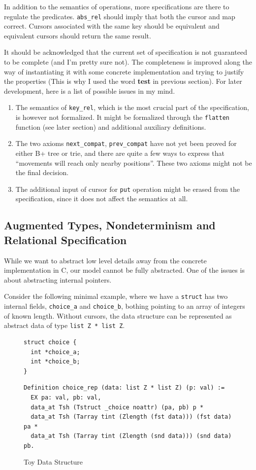 \documentclass[runningheads]{llncs}
\begin{document}
In addition to the semantics of operations, more specifications are there to
regulate the predicates. \texttt{abs\_rel} should imply that both the cursor and
map correct. Cursors associated with the same key should be equivalent and
equivalent cursors should return the same result.

It should be acknowledged that the current set of specification is not guaranteed
to be complete (and I'm pretty sure not). The completeness is improved along the
way of instantiating it with some concrete implementation and trying to justify
the properties (This is why I used the word \textbf{test} in previous section).
For later development, here is a list of possible issues in my mind.

\begin{enumerate}
\item The semantics of \texttt{key\_rel}, which is the most crucial part of the
  specification, is however not formalized. It might be formalized through the
  \texttt{flatten} function (see later section) and additional auxiliary
  definitions.
\item The two axioms \texttt{next\_compat}, \texttt{prev\_compat} have not yet
  been proved for either B+ tree or trie, and there are quite a few ways to
  express that ``movements will reach only nearby positions''. These two axioms
  might not be the final decision.
\item The additional input of cursor for \texttt{put} operation might be erased
  from the specification, since it does not affect the semantics at all.
\end{enumerate}

\subsection{Augmented Types, Nondeterminism and Relational Specification}

While we want to abstract low level details away from the concrete implementation
in C, our model cannot be fully abstracted. One of the issues is about
abstracting internal pointers.

Consider the following minimal example, where we have a \texttt{struct} has two
internal fields, \texttt{choice\_a} and \texttt{choice\_b}, bothing pointing to
an array of integers of known length. Without cursors, the data structure can be
represented as abstract data of type \texttt{list Z * list Z}.

\begin{figure}[htbp]
  \centering
\begin{verbatim}
struct choice {
  int *choice_a;
  int *choice_b;
}
\end{verbatim}
\begin{verbatim}
Definition choice_rep (data: list Z * list Z) (p: val) :=
  EX pa: val, pb: val,
  data_at Tsh (Tstruct _choice noattr) (pa, pb) p *
  data_at Tsh (Tarray tint (Zlength (fst data))) (fst data) pa *
  data_at Tsh (Tarray tint (Zlength (snd data))) (snd data) pb. 
\end{verbatim}
  \caption{Toy Data Structure}\label{fig:choice}
\end{figure}
\end{document}
